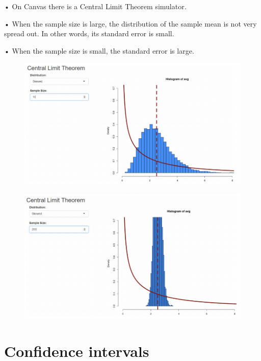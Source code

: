 \documentclass[
  letterpaper,
  DIV=11,
  numbers=noendperiod]{scrreprt}
\begin{document}
• On Canvas there is a Central Limit Theorem simulator.

• When the sample size is large, the distribution of the sample mean is
not very spread out. In other words, its standard error is small.

• When the sample size is small, the standard error is large.

\begin{figure}

{\centering \includegraphics{images/mod1_4.png}

}

\end{figure}

\begin{figure}

{\centering \includegraphics{images/mod1_5.png}

}

\end{figure}

\hypertarget{confidence-intervals}{%
\section{Confidence intervals}\label{confidence-intervals}}
\end{document}
